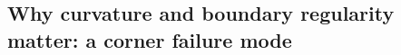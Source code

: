 \documentclass{article}
\newtheorem{remark}{Remark}
\begin{document}



\subsection{Why curvature and boundary regularity matter: a corner failure mode}
\label{app:polytope_failure}
\end{document}
